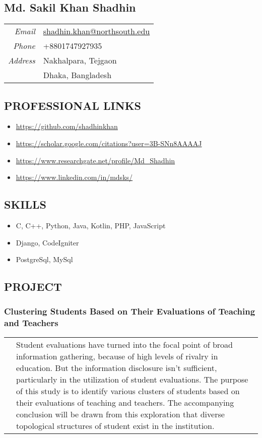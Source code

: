 \documentclass[10pt,twocolumn]{article}
\begin{document}
\subsection{Md. Sakil Khan Shadhin}
\begin{tabular}{>{\itshape}r|l}
    Email & \href{mailto:shadhin.khan@northsouth.edu}{shadhin.khan@northsouth.edu} \\
    Phone & +8801747927935\\
    Address & Nakhalpara, Tejgaon\\&Dhaka, Bangladesh
\end{tabular}


\subsection{PROFESSIONAL LINKS}
\begin{itemize}
  \item \url{https://github.com/shadhinkhan}
  \item \url{https://scholar.google.com/citations?user=3B-SNn8AAAAJ}
  \item \url{https://www.researchgate.net/profile/Md\_Shadhin}
  \item \url{https://www.linkedin.com/in/mdsks/}
\end{itemize}


\subsection{SKILLS}
\begin{itemize}
  \item C, C++, Python, Java, Kotlin, PHP, JavaScript
  \item Django, CodeIgniter
  \item PostgreSql, MySql
\end{itemize}


\subsection{PROJECT}
\subsubsection{Clustering Students Based on Their Evaluations of
Teaching and Teachers}
\begin{tabular}{>{\bfseries}r >{\footnotesize}p{}}
   & Student evaluations have turned into the focal point
of broad information gathering, because of high levels of rivalry
in education. But the information disclosure isn’t sufficient,
particularly in the utilization of student evaluations. The purpose
of this study is to identify various clusters of students based on
their evaluations of teaching and teachers. The accompanying
conclusion will be drawn from this exploration that diverse
topological structures of student exist in the institution.
\end{tabular}
\end{document}
